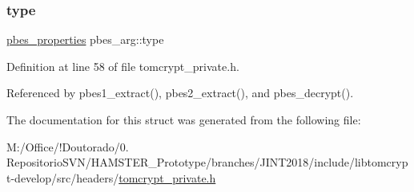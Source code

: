 \mbox{\label{structpbes__arg_a6879b93a34abc3b85c42fea0b0e92156}} 
\subsubsection{\texorpdfstring{type}{type}}
{\footnotesize\ttfamily \mbox{\hyperlink{structpbes__properties}{pbes\+\_\+properties}} pbes\+\_\+arg\+::type}



Definition at line 58 of file tomcrypt\+\_\+private.\+h.



Referenced by pbes1\+\_\+extract(), pbes2\+\_\+extract(), and pbes\+\_\+decrypt().



The documentation for this struct was generated from the following file\+:\begin{DoxyCompactItemize}
\item 
M\+:/\+Office/!\+Doutorado/0. Repositorio\+S\+V\+N/\+H\+A\+M\+S\+T\+E\+R\+\_\+\+Prototype/branches/\+J\+I\+N\+T2018/include/libtomcrypt-\/develop/src/headers/\mbox{\hyperlink{tomcrypt__private_8h}{tomcrypt\+\_\+private.\+h}}\end{DoxyCompactItemize}
